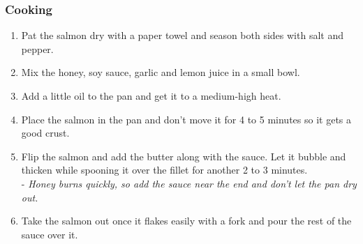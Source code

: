 \subsubsection{Cooking}
\begin{enumerate}
    \item Pat the salmon dry with a paper towel and season both sides with salt and pepper.
    \item Mix the honey, soy sauce, garlic and lemon juice in a small bowl.
    \item Add a little oil to the pan and get it to a medium-high heat.
    \item Place the salmon in the pan and don't move it for 4 to 5 minutes so it gets a good crust.
    \item Flip the salmon and add the butter along with the sauce. Let it bubble and thicken while spooning it over the fillet for another 2 to 3 minutes.\\
        - \textit{Honey burns quickly, so add the sauce near the end and don't let the pan dry out.}
    \item Take the salmon out once it flakes easily with a fork and pour the rest of the sauce over it.
\end{enumerate}
